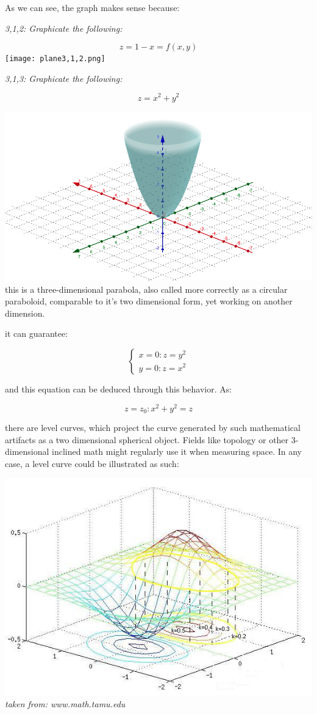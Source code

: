 \documentclass[11pt,fleqn]{book} %
\begin{document}
As we can see, the graph makes sense because:

\pagebreak
\textit{3,1,2: Graphicate the following:}

$$ z = 1-x = f(x,y) $$
\texttt{[image: plane3,1,2.png]}
\pagebreak

\textit{3,1,3: Graphicate the following:}

$$ z = x^2 + y^2 $$

\includegraphics[scale = 0.5]{Pictures/plane3,1,3.png}
this is a three-dimensional parabola, also called more correctly as a circular paraboloid, comparable to it's two dimensional form, yet 
working on another dimension.

it can guarantee:

$$ \begin{cases}
    x = 0: z = y^2 \\
    y = 0: z = x^2
\end{cases}$$

and this equation can be deduced through this behavior. As:

$$ z = z_0 : x^2 + y^2 = z $$

there are level curves, which project the curve generated by such mathematical artifacts as a two dimensional
spherical object. Fields like topology or other 3-dimensional inclined math might regularly use it
when measuring space. In any case, a level curve could be illustrated as such:
\begin{center}
    \includegraphics[]{Pictures/GraphCurves.png}    
    \textit{taken from: www.math.tamu.edu}
\end{center}
\end{document}
